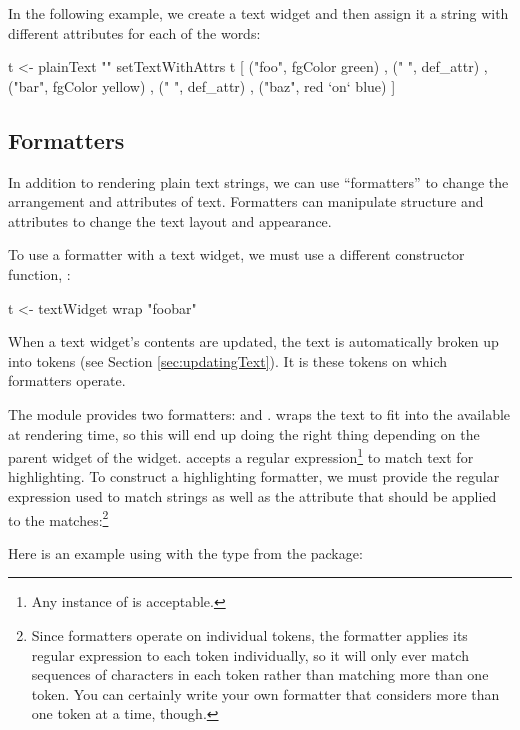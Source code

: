 In the following example, we create a text widget and then assign it a
string with different attributes for each of the words:

\begin{haskellcode}
 t <- plainText ""
 setTextWithAttrs t [ ("foo", fgColor green)
                    , (" ", def_attr)
                    , ("bar", fgColor yellow)
                    , (" ", def_attr)
                    , ("baz", red `on` blue)
                    ]
\end{haskellcode}

\subsection{Formatters}

In addition to rendering plain text strings, we can use ``formatters''
to change the arrangement and attributes of text.  Formatters can
manipulate structure and attributes to change the text layout and
appearance.

To use a formatter with a text widget, we must use a different
constructor function, :

\begin{haskellcode}
 t <- textWidget wrap "foobar"
\end{haskellcode}

When a text widget's contents are updated, the text is automatically
broken up into tokens (see Section \ref{sec:updatingText}).  It is
these tokens on which formatters operate.

The  module provides two formatters:  and
.   wraps the text to fit into the
 available at rendering time, so this will end up
doing the right thing depending on the parent widget of the
 widget.   accepts a regular
expression\footnote{Any instance of  is acceptable.} to
match text for highlighting.  To construct a highlighting formatter,
we must provide the regular expression used to match strings as well
as the attribute that should be applied to the matches:\footnote{Since
  formatters operate on individual tokens, the 
  formatter applies its regular expression to each token individually,
  so it will only ever match sequences of characters in each token
  rather than matching more than one token.  You can certainly write
  your own formatter that considers more than one token at a time,
  though.}

Here is an example using  with the  type from
the  package:

